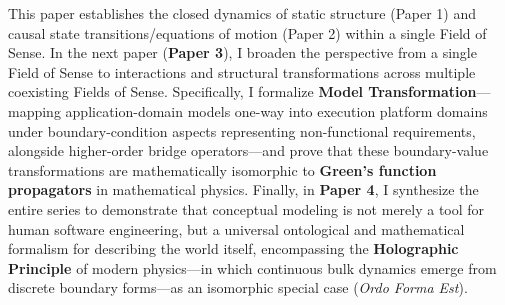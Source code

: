 \documentclass[11pt,a4paper]{article}
\theoremstyle{definition}
\theoremstyle{plain}
\theoremstyle{remark}
\begin{document}
This paper establishes the closed dynamics of static structure (Paper 1) and causal state transitions/equations of motion (Paper 2) within a single Field of Sense. In the next paper (\textbf{Paper 3}), I broaden the perspective from a single Field of Sense to interactions and structural transformations across multiple coexisting Fields of Sense. Specifically, I formalize \textbf{Model Transformation}---mapping application-domain models one-way into execution platform domains under boundary-condition aspects representing non-functional requirements, alongside higher-order bridge operators---and prove that these boundary-value transformations are mathematically isomorphic to \textbf{Green's function propagators} in mathematical physics. Finally, in \textbf{Paper 4}, I synthesize the entire series to demonstrate that conceptual modeling is not merely a tool for human software engineering, but a universal ontological and mathematical formalism for describing the world itself, encompassing the \textbf{Holographic Principle} of modern physics---in which continuous bulk dynamics emerge from discrete boundary forms---as an isomorphic special case (\emph{Ordo Forma Est}).
\end{document}

